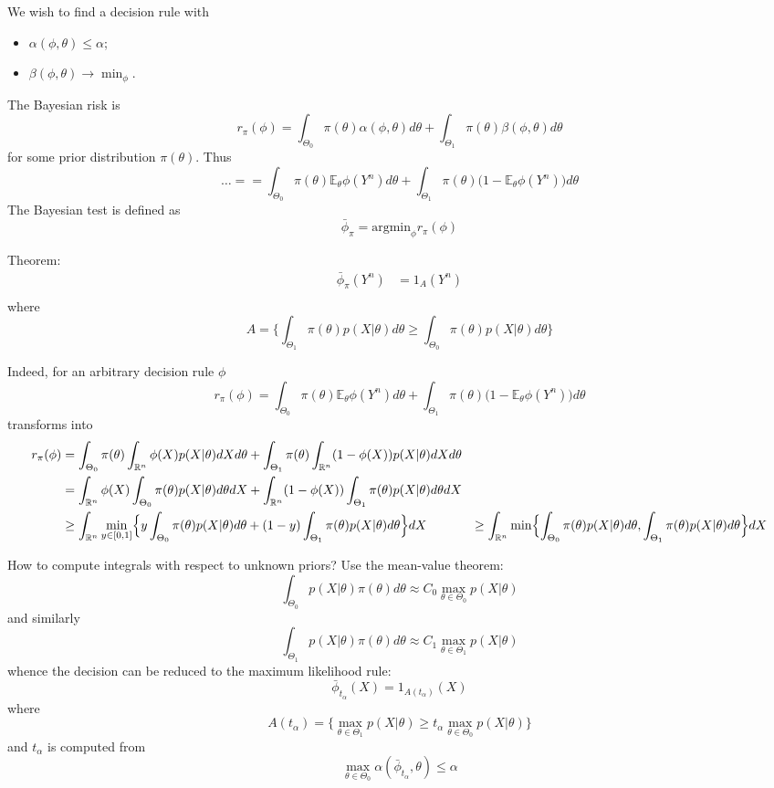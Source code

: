 \documentclass[a4paper]{article}
\newcommand{\Real}{\mathbb{R}}
\newcommand{\ex}{\mathbb{E}}
\begin{document}
We wish to find a decision rule with \begin{itemize}
	\item $\alpha(\phi,\theta)\leq \alpha$;
	\item $\beta(\phi,\theta)\to \min_\phi$.
\end{itemize}

The Bayesian risk is 
\[
r_\pi(\phi)
= \int_{\Theta_0} \pi(\theta) \alpha(\phi,\theta) d\theta
+ \int_{\Theta_1} \pi(\theta) \beta(\phi,\theta) d\theta
\]
for some prior distribution $\pi(\theta)$. Thus
\[
\ldots =
= \int_{\Theta_0} \pi(\theta) \ex_\theta \phi(Y^n) d\theta
+ \int_{\Theta_1} \pi(\theta) \bigl(1-\ex_\theta \phi(Y^n)\bigr) d\theta
\]
The Bayesian test is defined as
\[\bar{\phi}_\pi = \text{argmin}_{\phi} r_\pi(\phi)\]

Theorem:
\begin{align*}
	\bar{\phi}_\pi(Y^n) &= 1_{A}(Y^n)\\
\end{align*}
where
\[
A = \biggl\{
\int_{\Theta_1} \pi(\theta)p(X \rvert \theta) d\theta
\geq \int_{\Theta_0} \pi(\theta)p(X \rvert \theta) d\theta
\biggr\}
\]

Indeed, for an arbitrary decision rule $\phi$
\[
r_\pi(\phi)
= \int_{\Theta_0} \pi(\theta) \ex_\theta \phi(Y^n) d\theta
+ \int_{\Theta_1} \pi(\theta) \bigl(1-\ex_\theta \phi(Y^n)\bigr) d\theta
\]
transforms into
\begin{align*}
	r_\pi(\phi)
	&= \int_{\Theta_0} \pi(\theta)\int_{\Real^n} \phi(X) p(X \rvert \theta) dX d\theta
	+ \int_{\Theta_1} \pi(\theta) \int_{\Real^n} (1-\phi(X)) p(X \rvert \theta) dX d\theta\\
	&= \int_{\Real^n} \phi(X) \int_{\Theta_0} \pi(\theta)p(X \rvert \theta) d\theta dX
	+ \int_{\Real^n} (1-\phi(X)) \int_{\Theta_1} \pi(\theta) p(X \rvert \theta) d\theta dX\\
	&\geq \int_{\Real^n} \min_{y\in[0,1]} \Bigl\{
		y \int_{\Theta_0} \pi(\theta)p(X \rvert \theta) d\theta
	+ (1-y) \int_{\Theta_1} \pi(\theta) p(X \rvert \theta) d\theta \Bigr\}dX
	&\geq \int_{\Real^n} \min\Bigl\{
		\int_{\Theta_0} \pi(\theta)p(X \rvert \theta) d\theta,
		\int_{\Theta_1} \pi(\theta) p(X \rvert \theta) d\theta
	\Bigr\}dX
\end{align*}

How to compute integrals with respect to unknown priors? Use the mean-value theorem:
\[
\int_{\Theta_0} p(X\rvert \theta) \pi(\theta) d\theta
\approx C_0 \max_{\theta\in \Theta_0} p(X\rvert \theta)
\]
and similarly
\[
\int_{\Theta_1} p(X\rvert \theta) \pi(\theta) d\theta
\approx C_1 \max_{\theta\in \Theta_1} p(X\rvert \theta)
\]
whence the decision can be reduced to the maximum likelihood rule:
\[
\bar{\phi}_{t_\alpha}(X) = 1_{A(t_\alpha)}(X)
\]
where
\[
A(t_\alpha)
= \Biggl\{\max_{\theta\in \Theta_1} p(X\rvert \theta)
\geq t_\alpha \max_{\theta\in \Theta_0} p(X\rvert \theta)
\Biggr\}
\]
and $t_\alpha$ is computed from
\[\max_{\theta\in \Theta_0}\alpha(\bar{\phi}_{t_\alpha},\theta) \leq \alpha\]
\end{document}

